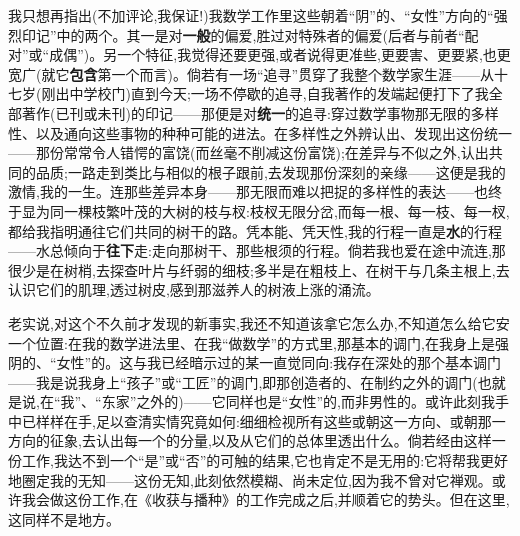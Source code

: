 我只想再指出(不加评论,我保证!)我数学工作里这些朝着“阴”的、“女性”方向的“强烈印记”中的两个\dmark{}。其一是对\textbf{一般}的偏爱,胜过对特殊者的偏爱(后者与前者“配对”或“成偶”)。另一个特征,我觉得还要更强,或者说得更准些,更要害、更要紧,也更宽广(就它\textbf{包含}第一个而言)。倘若有一场“追寻”贯穿了我整个数学家生涯——从十七岁(刚出中学校门)直到今天;一场不停歇的追寻,自我著作的发端起便打下了我全部著作(已刊或未刊)的印记——那便是对\textbf{统一}的追寻:穿过数学事物那无限的多样性、以及通向这些事物的种种可能的进法。在多样性之外辨认出、发现出这份统一——那份常常令人错愕的富饶(而丝毫不削减这份富饶);在差异与不似之外,认出共同的品质;一路走到类比与相似的根子跟前,去发现那份深刻的亲缘——这便是我的激情,我的一生。连那些差异本身——那无限而难以把捉的多样性的表达——也终于显为同一棵枝繁叶茂的大树的枝与杈:枝杈无限分岔,而每一根、每一枝、每一杈,都给我指明通往它们共同的树干的路。凭本能、凭天性,我的行程一直是\textbf{水}的行程——水总倾向于\textbf{往下}走:走向那树干、那些根须的行程。倘若我也爱在途中流连,那很少是在树梢,去探查叶片与纤弱的细枝;多半是在粗枝上、在树干与几条主根上,去认识它们的肌理,透过树皮,感到那滋养人的树液上涨的涌流。

\asterisms

\dmark{}老实说,对这个不久前才发现的新事实,我还不知道该拿它怎么办,不知道怎么给它安一个位置:在我的数学进法里、在我“做数学”的方式里,那基本的调门,在我身上是强阴的、“女性”的。这与我已经暗示过的某一直觉同向:我存在深处的那个基本调门——我是说我身上“孩子”或“工匠”的调门,即那创造者的、在制约之外的调门(也就是说,在“我”、“东家”之外的)——它同样也是“女性”的,而非男性的。或许此刻我手中已样样在手,足以查清实情究竟如何:细细检视所有这些或朝这一方向、或朝那一方向的征象,去认出每一个的分量,以及从它们的总体里透出什么。倘若经由这样一份工作,我达不到一个“是”或“否”的可触的结果,它也肯定不是无用的:它将帮我更好地圈定我的无知——这份无知,此刻依然模糊、尚未定位,因为我不曾对它禅观。或许我会做这份工作,在《收获与播种》的工作完成之后,并顺着它的势头。但在这里,这同样不是地方。

